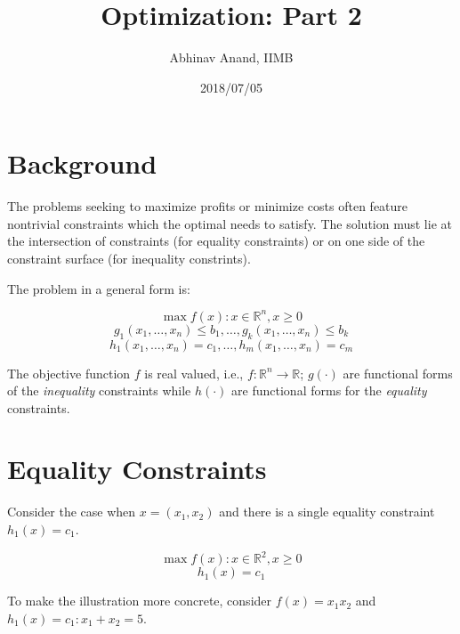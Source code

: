 \documentclass[11pt,]{article}
\title{Optimization: Part 2}
\author{Abhinav Anand, IIMB}
\date{2018/07/05}
\begin{document}
\maketitle

\section{Background}\label{background}

The problems seeking to maximize profits or minimize costs often feature
nontrivial constraints which the optimal needs to satisfy. The solution
must lie at the intersection of constraints (for equality constraints)
or on one side of the constraint surface (for inequality constrints).

The problem in a general form is:

\[
\max f(x): x\in \mathbb{R}^n, x\geq 0
\] \[
g_1(x_1,\hdots,x_n)\leq b_1,\hdots,g_k(x_1,\hdots,x_n)\leq b_k
\] \[
h_1(x_1,\hdots,x_n)= c_1,\hdots,h_m(x_1,\hdots,x_n)= c_m
\]

The objective function \(f\) is real valued, i.e.,
\(f:\mathbb{R}^n \to \mathbb{R}\); \(g(\cdot)\) are functional forms of
the \emph{inequality} constraints while \(h(\cdot)\) are functional
forms for the \emph{equality} constraints.

\section{Equality Constraints}\label{equality-constraints}

Consider the case when \(x=(x_1, x_2)\) and there is a single equality
constraint \(h_1(x) = c_1\).

\[
\max f(x): x\in \mathbb{R}^2, x\geq 0
\] \[
h_1(x) = c_1
\]

To make the illustration more concrete, consider \(f(x) = x_1x_2\) and
\(h_1(x)=c_1:x_1+ x_2=5\).
\end{document}
